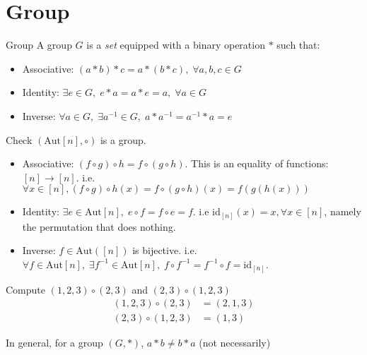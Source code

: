 \section{Group}

\begin{Definition}{Group}{}
  A group $G$ is a \emph{set} equipped with a binary operation $*$ such that:
  \begin{itemize}
    \item Associative: $(a * b) * c = a * (b * c), \; \forall a, b, c \in G$
    \item Identity: $\exists e \in G, \; e * a = a * e = a, \; \forall a \in G$
    \item Inverse: $\forall a \in G, \; \exists a^{-1} \in G, \; a * a^{-1} = a^{-1} * a = e$
  \end{itemize}
\end{Definition}

\begin{Example}{}{}
  Check $(\text{Aut}[n], \circ)$ is a group.
  \begin{itemize}
    \item Associative: $(f \circ g) \circ h = f \circ (g \circ h)$. This is an equality of functions: $[n] \to [n]$.
    \newline i.e. $\forall x \in [n], (f \circ g) \circ h(x) = f \circ (g \circ h) (x) = f(g(h(x)))$
    \item Identity: $\exists e \in \text{Aut}[n], \; e \circ f = f \circ e = f$. i.e $\text{id}_{[n]}(x) = x, \forall x \in [n]$, namely the permutation that does nothing.
    \item Inverse: $f \in \text{Aut}([n])$ is bijective. 
    \newline i.e. $\forall f \in \text{Aut}[n], \; \exists f^{-1} \in \text{Aut}[n], \; f \circ f^{-1} = f^{-1} \circ f = \text{id}_{[n]}$. 
  \end{itemize}
\end{Example}


\begin{exercise}
  Compute $(1, 2, 3) \circ (2, 3)$ and $(2, 3) \circ (1, 2, 3)$ \\
  \[
  \begin{aligned}
    (1, 2, 3) \circ (2, 3) &= (2, 1, 3) \\
    (2, 3) \circ (1, 2, 3) &= (1, 3)
  \end{aligned}
  \]
\end{exercise}

In general, for a group $(G, *)$, $a * b \neq b*a$ (not necessarily)

